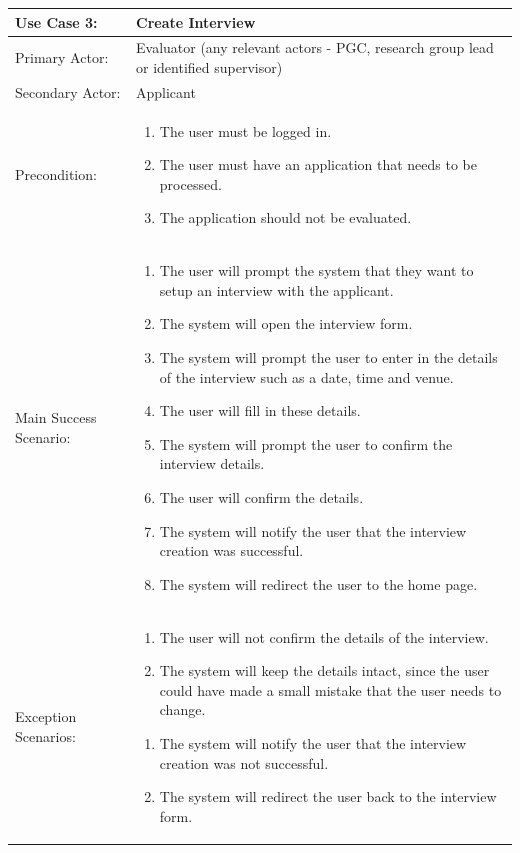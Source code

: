 \documentclass{article}
\begin{document}
\begin{tabular} {| m{5cm} | m{10cm} |}
\hline
Use Case 3: & Create Interview \\
\hline
Primary Actor: & Evaluator (any relevant actors - PGC, research group lead or identified supervisor) \\
\hline
Secondary Actor: & Applicant \\
\hline
Precondition: & \begin{enumerate} \itemsep0em \item The user must be logged in.
\item The user must have an application that needs to be processed.
\item The application should not be evaluated.
\end{enumerate} \\
\hline
Main Success Scenario: & \begin{enumerate} \itemsep0em \item The user will prompt the system that they want to setup an interview with the applicant.
\item The system will open the interview form.
\item The system will prompt the user to enter in the details of the interview such as a date, time and venue.
\item The user will fill in these details.
\item The system will prompt the user to confirm the interview details.
\item The user will confirm the details.
\item The system will notify the user that the interview creation was successful.
\item The system will redirect the user to the home page.
\end{enumerate} \\
\hline
Exception Scenarios: & \begin{enumerate} \itemsep0em \item The user will not confirm the details of the interview.
\item The system will keep the details intact, since the user could have made a small mistake that the user needs to change.
\end{enumerate} \begin{enumerate} \itemsep0em \item  The system will notify the user that the interview creation was not successful.
\item The system will redirect the user back to the interview form.
\end{enumerate}\\
\hline
\end{tabular}
\end{document}
